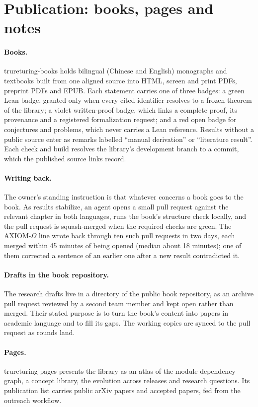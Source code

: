 \documentclass[11pt]{article}
\newcommand{\code}[1]{\texttt{\detokenize{#1}}}
\begin{document}
\section{Publication: books, pages and notes}
\label{sec:publication}
\paragraph{Books.} trureturing-books \citep{booksrepo} holds bilingual
(Chinese and English) monographs and textbooks built from one aligned source
into HTML, screen and print PDFs, preprint PDFs and EPUB. Each statement
carries one of three badges: a green Lean badge, granted only when every
cited identifier resolves to a frozen theorem of the library; a violet
written-proof badge, which links a complete proof, its provenance and a
registered formalization request; and a red open badge for conjectures and
problems, which never carries a Lean reference. Results without a public
source enter as remarks labelled ``manual derivation'' or ``literature
result''. Each check and build resolves the library's development branch to
a commit, which the published source links record.

\paragraph{Writing back.} The owner's standing instruction is that whatever
concerns a book goes to the book. As results stabilize, an agent opens a
small pull request against the relevant chapter in both languages, runs the
book's structure check locally, and the pull request is squash-merged when
the required checks are green. The AXIOM-$\Omega$ line wrote back through
ten such pull requests in two days, each merged within 45 minutes of being
opened (median about 18 minutes); one of them corrected a sentence of an
earlier one after a new result contradicted it.

\paragraph{Drafts in the book repository.} The research drafts live in a
\code{paper/} directory of the public book repository, as an archive pull
request reviewed by a second team member and kept open rather than merged.
Their stated purpose is to turn the book's content into papers in academic
language and to fill its gaps. The working copies are synced to the pull
request as rounds land.

\paragraph{Pages.} trureturing-pages presents the library as an atlas of the
module dependency graph, a concept library, the evolution across releases and
research questions. Its publication list carries public arXiv papers and
accepted papers, fed from the outreach workflow.
\end{document}
